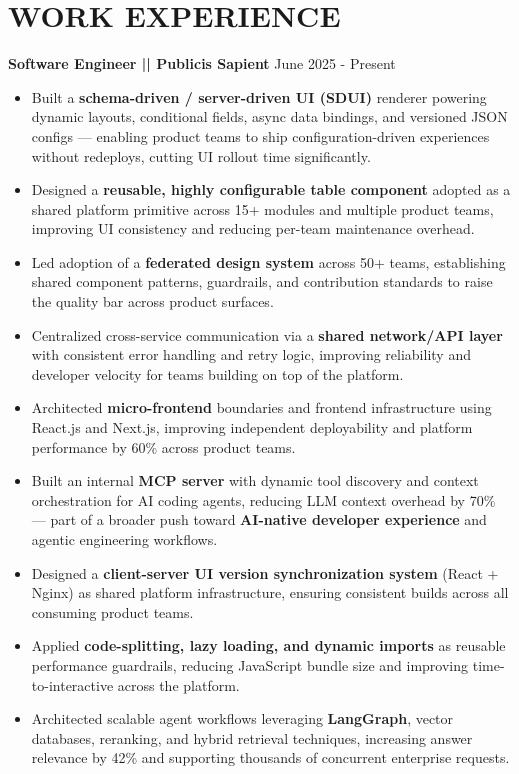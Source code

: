 \section*{WORK EXPERIENCE}
\textbf{Software Engineer || Publicis Sapient}
\hfill June 2025 - Present
\begin{itemize}
\vspace{2pt}

\item {Built a \textbf{schema-driven / server-driven UI (SDUI)} renderer powering dynamic layouts, conditional fields, async data bindings, and versioned JSON configs — enabling product teams to ship configuration-driven experiences without redeploys, cutting UI rollout time significantly.}
\item {Designed a \textbf{reusable, highly configurable table component} adopted as a shared platform primitive across 15+ modules and multiple product teams, improving UI consistency and reducing per-team maintenance overhead.}
\item {Led adoption of a \textbf{federated design system} across 50+ teams, establishing shared component patterns, guardrails, and contribution standards to raise the quality bar across product surfaces.}
\item {Centralized cross-service communication via a \textbf{shared network/API layer} with consistent error handling and retry logic, improving reliability and developer velocity for teams building on top of the platform.}
\item {Architected \textbf{micro-frontend} boundaries and frontend infrastructure using React.js and Next.js, improving independent deployability and platform performance by 60\% across product teams.}
\item {Built an internal \textbf{MCP server} with dynamic tool discovery and context orchestration for AI coding agents, reducing LLM context overhead by 70\% — part of a broader push toward \textbf{AI-native developer experience} and agentic engineering workflows.}
\item {Designed a \textbf{client-server UI version synchronization system} (React + Nginx) as shared platform infrastructure, ensuring consistent builds across all consuming product teams.}
\item {Applied \textbf{code-splitting, lazy loading, and dynamic imports} as reusable performance guardrails, reducing JavaScript bundle size and improving time-to-interactive across the platform.}
\item {Architected scalable agent workflows leveraging \textbf{LangGraph}, vector databases, reranking, and hybrid retrieval techniques, increasing answer relevance by 42\% and supporting thousands of concurrent enterprise requests.}

\end{itemize}
